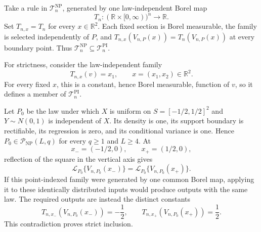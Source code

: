 Take a rule in \(\mathcal T_n^{\mathrm{NP}}\), generated by one law-independent Borel map
\[
 T_n:(\mathbb R\times[0,\infty))^n\longrightarrow\mathbb R.
\]
Set \(T_{n,x}=T_n\) for every \(x\in\mathbb R^2\).  Each fixed section is Borel measurable, the family is selected independently of \(P\), and \(T_{n,x}(V_{n,P}(x))=T_n(V_{n,P}(x))\) at every boundary point.  Thus \(\mathcal T_n^{\mathrm{NP}}\subseteq\mathcal T_n^{\mathrm{PI}}\).

For strictness, consider the law-independent family
\[
 T_{n,x}(v)=x_1,
 \qquad x=(x_1,x_2)\in\mathbb R^2.
\]
For every fixed \(x\), this is a constant, hence Borel measurable, function of \(v\), so it defines a member of \(\mathcal T_n^{\mathrm{PI}}\).

Let \(P_0\) be the law under which \(X\) is uniform on \(S=[-1/2,1/2]^2\) and \(Y\sim N(0,1)\) is independent of \(X\).  Its density is one, its support boundary is rectifiable, its regression is zero, and its conditional variance is one.  Hence \(P_0\in\mathcal P_{\mathrm{NP}}(L,q)\) for every \(q\geq1\) and \(L\geq4\).  At
\[
 x_-=(-1/2,0),
 \qquad
 x_+=(1/2,0),
\]
reflection of the square in the vertical axis gives
\[
 \mathcal L_{P_0}\{V_{n,P_0}(x_-)\}
 =\mathcal L_{P_0}\{V_{n,P_0}(x_+)\}.
\]
If this point-indexed family were generated by one common Borel map, applying it to these identically distributed inputs would produce outputs with the same law.  The required outputs are instead the distinct constants
\[
 T_{n,x_-}(V_{n,P_0}(x_-))=-\frac12,
 \qquad
 T_{n,x_+}(V_{n,P_0}(x_+))=\frac12.
\]
This contradiction proves strict inclusion.